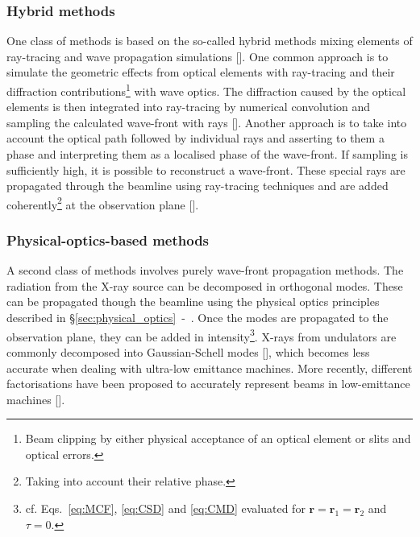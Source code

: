 \begin{refsection}
\subsubsection*{Hybrid methods}

One class of methods is based on the so-called hybrid methods mixing elements of ray-tracing and wave propagation simulations [\cite{Semichaevsky2001}]. One common approach is to simulate the geometric effects from optical elements with ray-tracing and their diffraction contributions\footnote{Beam clipping by either physical acceptance of an optical element or slits and optical errors.} with wave optics. The diffraction caused by the optical elements is then integrated into ray-tracing by numerical convolution and sampling the calculated wave-front with rays [\cite{Shi2014}]. Another approach is to take into account the optical path followed by individual rays and asserting to them a phase and interpreting them as a localised phase of the wave-front. If sampling is sufficiently high, it is possible to reconstruct a wave-front. These special rays are propagated through the beamline using ray-tracing techniques and are added coherently\footnote{Taking into account their relative phase.} at the observation plane [\cite{Prodi2011}].

\subsubsection*{Physical-optics-based methods}

A second class of methods involves purely wave-front propagation methods. The radiation from the X-ray source can be decomposed in orthogonal modes. These can be propagated though the beamline using the physical optics principles described in §\ref{sec:physical_optics}~-~\textit{}. Once the modes are propagated to the observation plane, they can be added in intensity\footnote{cf. Eqs.~\ref{eq:MCF}, \ref{eq:CSD} and \ref{eq:CMD} evaluated for $\textbf{r}=\textbf{r}_1=\textbf{r}_2$ and $\tau=0$.}. X-rays from undulators are commonly decomposed into Gaussian-Schell modes
[\cite{Coisson1997, Singer2011}], which becomes less accurate when dealing with ultra-low emittance machines. More recently, different factorisations have been proposed to accurately represent beams in low-emittance machines [\cite{Lindberg2015, Glass_2017}].


\end{refsection}
